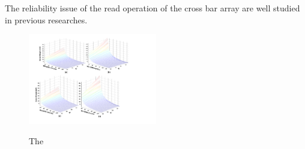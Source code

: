 The reliability issue of the read operation of the cross bar array are well studied in previous researches.
%

%

\begin{figure}%
\centering
  \includegraphics[width=0.5\textwidth]{./figures/sense_margin2}\\
  \caption{The}\label{fig:sense_margin}
\end{figure} 